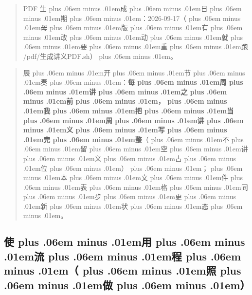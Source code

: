 \documentclass[
]{article}
\newcommand{\passthrough}[1]{#1}
\def\zh#1{{\zhfont #1}}
\def\codezh#1{{\zhmonofont #1}}
\def\zhglue{\hskip0pt plus .06em minus .01em}
\begin{document}
\begin{quote}
PDF \zh{生\zhglue 成\zhglue 日\zhglue 期\zhglue ：}2026-09-17\zh{（\zhglue 母\zhglue 版\zhglue 有\zhglue 改\zhglue 动\zhglue 就\zhglue 要\zhglue 重\zhglue 跑} \passthrough{\codezh{{\zh{环}}{\zh{境}}/pdf/{\zh{生}}{\zh{成}}{\zh{讲}}{\zh{义}}PDF.sh}}\zh{）\zhglue 。}
\end{quote}

\begin{quote}
\zh{展\zhglue 开\zhglue 节\zhglue 奏\zhglue ：}\textbf{\zh{每\zhglue 周\zhglue 讲\zhglue 之\zhglue 前\zhglue ，\zhglue 我\zhglue 把\zhglue 当\zhglue 周\zhglue 讲\zhglue 义\zhglue 写\zhglue 完\zhglue 整}}\zh{（\zhglue 不\zhglue 留\zhglue 空\zhglue 讲\zhglue 义\zhglue 占\zhglue 位\zhglue ）\zhglue ；\zhglue 本\zhglue 文\zhglue 件\zhglue 表\zhglue 格\zhglue 同\zhglue 步\zhglue 更\zhglue 新\zhglue 状\zhglue 态\zhglue 。}
\end{quote}

\subsection{\zh{使\zhglue 用\zhglue 流\zhglue 程\zhglue （\zhglue 照\zhglue 做\zhglue ）}}\label{ux4f7fux7528ux6d41ux7a0bux7167ux505a}
\end{document}
